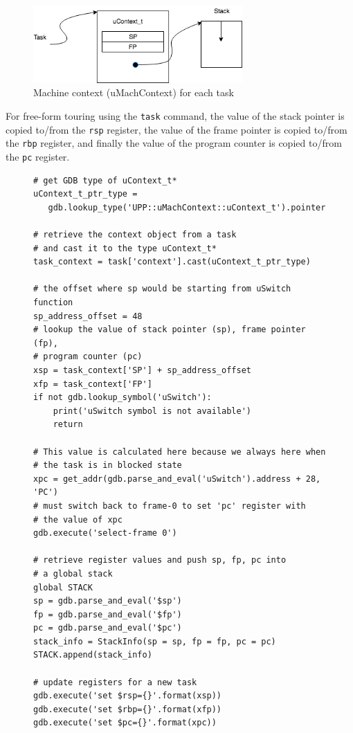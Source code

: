 \begin{figure}[h]
    \centering
    \includegraphics[width=8cm]{uContext_stack}
    \caption{Machine context (uMachContext) for each task}
    \label{machine-context}
\end{figure}

For free-form touring using the \verb|task| command, the value of the stack
pointer is copied to/from the \verb|rsp| register, the value of the frame
pointer is copied to/from the \verb|rbp| register, and finally the value of the
program counter is copied to/from the \verb|pc| register.

\begin{figure}
\begin{lstlisting}[style=Python, caption={Abridged \texttt{push\_task} source
code}, label={pushtask-code}, basicstyle=\small\tt]
# get GDB type of uContext_t*
uContext_t_ptr_type =
   gdb.lookup_type('UPP::uMachContext::uContext_t').pointer

# retrieve the context object from a task
# and cast it to the type uContext_t*
task_context = task['context'].cast(uContext_t_ptr_type)

# the offset where sp would be starting from uSwitch function
sp_address_offset = 48
# lookup the value of stack pointer (sp), frame pointer (fp),
# program counter (pc)
xsp = task_context['SP'] + sp_address_offset
xfp = task_context['FP']
if not gdb.lookup_symbol('uSwitch'):
    print('uSwitch symbol is not available')
    return

# This value is calculated here because we always here when
# the task is in blocked state
xpc = get_addr(gdb.parse_and_eval('uSwitch').address + 28, 'PC')
# must switch back to frame-0 to set 'pc' register with
# the value of xpc
gdb.execute('select-frame 0')

# retrieve register values and push sp, fp, pc into
# a global stack
global STACK
sp = gdb.parse_and_eval('$sp')
fp = gdb.parse_and_eval('$fp')
pc = gdb.parse_and_eval('$pc')
stack_info = StackInfo(sp = sp, fp = fp, pc = pc)
STACK.append(stack_info)

# update registers for a new task
gdb.execute('set $rsp={}'.format(xsp))
gdb.execute('set $rbp={}'.format(xfp))
gdb.execute('set $pc={}'.format(xpc))
\end{lstlisting}
\end{figure}

